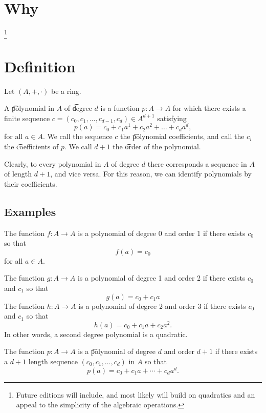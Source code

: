 
\section*{Why}

  \ifhmode\unskip\fi\footnote{
Future editions will include, and most likely will build on quadratics and an appeal to the simplicity of the  algebraic operations.
  }

\section*{Definition}

Let $(A, +, \cdot )$ be a ring.

A \t{polynomial} in $A$ of \t{degree} $d$ is a function $p: A \to A$ for which there exists a finite sequence $c = (c_0, c_1, \dots , c_{d-1}, c_d) \in A^{d+1}$ satisfying
  \[
p(a) = c_0 + c_1a^1 + c_2a^2 + \dots  + c_da^d,
  \]
for all $a \in A$.
We call the sequence $c$ the \t{polynomial coefficients}, and call the $c_i$ the \t{coefficients} of $p$.
We call $d+1$ the \t{order} of the polynomial.

Clearly, to every polynomial in $A$ of degree $d$ there corresponds a sequence in $A$ of length $d+1$, and vice versa.
For this reason, we can identify polynomials by their coefficients.

\subsection*{Examples}

The function $f: A \to A$ is a polynomial of degree 0 and order 1 if there exists $c_0$ so that
  \[
f(a) = c_0
  \]
for all $a \in A$.

The function $g: A \to A$ is a polynomial of degree 1 and order 2 if there exists $c_0$ and $c_1$ so that
  \[
g(a) = c_0 + c_1a
  \]
The function $h: A \to A$ is a polynomial of degree 2 and order 3 if there exists $c_0$ and $c_1$ so that
  \[
h(a) = c_0 + c_1a + c_2a^2.
  \]
In other words, a second degree polynomial is a quadratic.

The function $p: A \to A$ is a \t{polynomial} of degree $d$ and order $d+1$ if there exists a $d+1$ length sequence $(c_0, c_1, \dots , c_d)$ in $A$ so that
  \[
p(a) = c_0 + c_1a + \cdots + c_da^d.
  \]

\blankpage